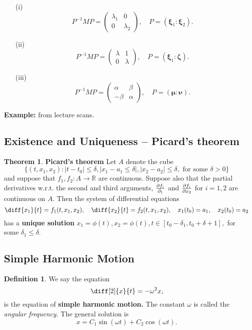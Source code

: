 \documentclass[12pt, a4paper]{article}
\newcommand{\bb}[1]{\mathbb{#1}}
\theoremstyle{definition}
\newtheorem{definition}{Definition}[section]
\newtheorem{theorem}{Theorem}[section]
\theoremstyle{plain}
\begin{document}
\begin{itemize}

	\item[(i)] $$P^{-1}MP=\begin{pmatrix} \lambda_1&0\\0&\lambda_2 \end{pmatrix}, \quad P=(\bm{\xi}_1:\bm{\xi}_2).$$

	\item[(ii)] $$P^{-1}MP=\begin{pmatrix} \lambda&1\\0&\lambda \end{pmatrix}, \quad P=(\bm{\xi}_1:\bm{\zeta}).$$

	\item[(iii)] $$P^{-1}MP=\begin{pmatrix} \alpha&\beta\\-\beta&\alpha \end{pmatrix}, \quad P=(\bm{\mu}:\bm{\nu}).$$

\end{itemize}

\textbf{Example:} from lecture scans.


\subsection{Existence and Uniqueness -- Picard's theorem}

\begin{theorem}
\textbf{Picard’s theorem} Let $A$ denote the cube $$\{(t,x_1,x_2):|t-t_0|\leq \delta, |x_1-a_1\leq \delta|, |x_2-a_2|\leq \delta, \text{ for some } \delta>0\}$$ and suppose that $f_1,f_2 : A \to \bb{R}$ are continuous. Suppose also that the partial derivatives w.r.t. the second and third arguments, $\pdv{f_i}{_1}$ and $\pdv{f_i}{x_2}$ for $i = 1,2$ are continuous on $A.$  Then the system of differential equations $$\diff{x_1}{t}=f_1(t,x_1,x_2), \quad \diff{x_2}{t}=f_2(t,x_1,x_2), \quad x_1(t_0)=a_1, \quad x_2(t_0)=a_2$$ has a \textbf{unique solution} $x_1=\phi(t),x_2=\phi(t), t\in[t_0-\delta_1,t_0+\delta+1],$ for some $\delta_1\leq \delta.$
\end{theorem}

\subsection{Simple Harmonic Motion}

\begin{definition}
We say the equation $$\diff[2]{x}{t}=-\omega^2x,$$ is the equation of \textbf{simple harmonic motion.} The constant $\omega$ is called the \textit{angular frequency.} The general solution is $$x=C_1\sin(\omega t)+C_2\cos(\omega t).$$
\end{definition}
\end{document}
